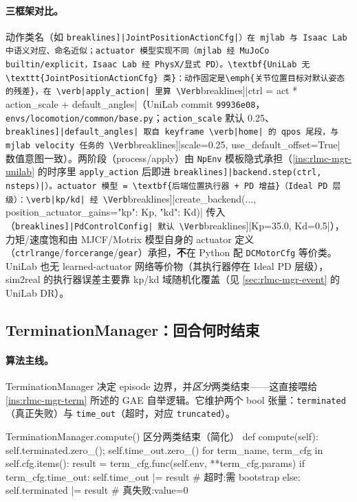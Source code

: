 \paragraph{三框架对比。}动作类名（如 \Verb[breaklines]|JointPositionActionCfg|）在 mjlab 与 Isaac Lab 中语义对应、命名近似；actuator 模型实现不同（mjlab 经 MuJoCo builtin/explicit，Isaac Lab 经 PhysX/显式 PD）。\textbf{UniLab 无 \texttt{JointPositionActionCfg} 类}：动作固定是\emph{关节位置目标对默认姿态的残差}，在 \verb|apply_action| 里算 \Verb[breaklines]|ctrl = act * action_scale + default_angles|（UniLab commit \texttt{99936e08}，\texttt{envs/\allowbreak locomotion/\allowbreak common/\allowbreak base.\allowbreak py}；\verb|action_scale| 默认 0.25、\Verb[breaklines]|default_angles| 取自 keyframe \verb|home| 的 qpos 尾段，与 mjlab velocity 任务的 \Verb[breaklines]|scale=0.25, use_default_offset=True| 数值意图一致）。两阶段（process/apply）由 \verb|NpEnv| 模板隐式承担（\cref{ins:rlmc-mgr-unilab} 的时序里 \verb|apply_action| 后即进 \Verb[breaklines]|backend.step(ctrl, nsteps)|）。actuator 模型 = \textbf{后端位置执行器 + PD 增益}（Ideal PD 层级）：\verb|kp/kd| 经 \Verb[breaklines]|create_backend(..., position_actuator_gains={"kp": Kp, "kd": Kd})| 传入（\Verb[breaklines]|PdControlConfig| 默认 \Verb[breaklines]|Kp=35.0, Kd=0.5|），力矩/速度饱和由 MJCF/Motrix 模型自身的 actuator 定义（\verb|ctrlrange|/\allowbreak\verb|forcerange|/\allowbreak\verb|gear|）承担，\textbf{不}在 Python 配 \verb|DCMotorCfg| 等价类。UniLab 也无 learned-actuator 网络等价物（其执行器停在 Ideal PD 层级），sim2real 的执行器误差主要靠 kp/kd 域随机化覆盖（见 \cref{sec:rlmc-mgr-event} 的 UniLab DR）。

\subsection{TerminationManager：回合何时结束}
\label{sec:rlmc-mgr-term}

\paragraph{算法主线。}TerminationManager 决定 episode 边界，并\emph{区分}两类结束——这直接喂给 \cref{ins:rlmc-mgr-term} 所述的 GAE 自举逻辑。它维护两个 bool 张量：\verb|terminated|（真正失败）与 \verb|time_out|（超时，对应 \verb|truncated|）。

\begin{codebox}[Python]{TerminationManager.compute() 区分两类结束（简化）}
def compute(self):
    self.terminated.zero_(); self.time_out.zero_()
    for term_name, term_cfg in self.cfg.items():
        result = term_cfg.func(self.env, **term_cfg.params)
        if term_cfg.time_out:
            self.time_out |= result        # 超时:需 bootstrap
        else:
            self.terminated |= result      # 真失败:value=0
\end{codebox}

